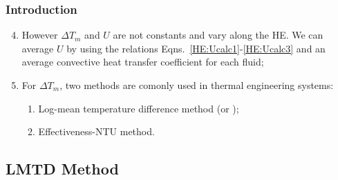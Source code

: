 \documentclass[10pt,compress,unknownkeysallowed]{beamer}
\begin{document}
\begin{frame}
  \frametitle{Introduction}
     \begin{enumerate}\setcounter{enumi}{3}
          \item<1-> However $\Delta T_{m}$ and $U$ are not constants and vary along the HE. We can average $U$ by using the relations Eqns.~\ref{HE:Ucalc1}-\ref{HE:Ucalc3} and an average convective heat transfer coefficient for each fluid;
          \item<2-> For $\Delta T_{m}$, two methods are comonly used in thermal engineering systems:
             \begin{enumerate}
                \item<2-> Log-mean temperature difference method (or );
                \item<2-> Effectiveness-NTU method.
             \end{enumerate}
     \end{enumerate}

\end{frame}


\subsection{LMTD Method}
\end{document}
